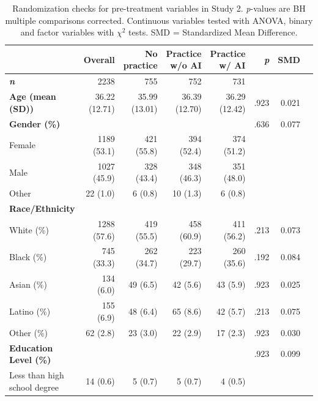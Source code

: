 \documentclass[11pt]{report}
\begin{document}
\begin{append}
\begin{table}[ht]
    \centering
        \caption{Randomization checks for pre-treatment variables in Study 2. \textit{p}-values are BH multiple comparisons corrected. Continuous variables tested with ANOVA, binary and factor variables with $\chi^2$ tests. SMD = Standardized Mean Difference.}
    \label{tab:s2randomization}
\begin{tabular}{lrrrrrrr}
\toprule
\multicolumn{1}{l}{} & Overall & No practice & Practice w/o AI & Practice w/ AI & \textit{p} &  SMD \\ 
\midrule\addlinespace[2.5pt]
\textit{\textbf{n}} & 2238 &  755 &  752 &  731 &  &   \\ 
\textbf{Age (mean (SD))} & 36.22 (12.71) & 35.99 (13.01) & 36.39 (12.70) & 36.29 (12.42) & .923  &  0.021 \\ 
\textbf{Gender (\%)} &  &   &   &   & .636 &   0.077 \\ 
\hspace{1em}   Female & 1189 (53.1)  &  421 (55.8)  &  394 (52.4)  &  374 (51.2)  &  &  \\ 
   \hspace{1em}Male & 1027 (45.9)  &  328 (43.4)  &  348 (46.3)  &  351 (48.0)  &  &    \\ 
   \hspace{1em}Other &   22 (1.0)  &    6 (0.8)  &   10 (1.3)  &    6 (0.8)    &  &  \\ 
   \textbf{Race/Ethnicity} &  &   &   &   &  &  \\
\hspace{1em}White (\%) & 1288 (57.6)  &  419 (55.5)  &  458 (60.9)  &  411 (56.2)  & .213 &  0.073 \\ 
\hspace{1em}Black (\%) &  745 (33.3)  &  262 (34.7)  &  223 (29.7)  &  260 (35.6)  & .192 &  0.084 \\ 
\hspace{1em}Asian (\%) &  134 (6.0)  &   49 (6.5)  &   42 (5.6)  &   43 (5.9)  & .923   &  0.025 \\ 
\hspace{1em}Latino (\%) &  155 (6.9)  &   48 (6.4)  &   65 (8.6)  &   42 (5.7)  & .213   &  0.075 \\
\hspace{1em}Other (\%) &   62 (2.8)  &   23 (3.0)  &   22 (2.9)  &   17 (2.3)  & .923 &   0.030 \\ 
\textbf{Education Level (\%)} &  &   &   &   & .923 &    0.099 \\ 
   \hspace{1em}Less than high school degree &   14 (0.6)  &    5 (0.7)  &    5 (0.7)  &    4 (0.5)  &    &  \\ 

\end{tabular}
\end{table}
\end{append}
\end{document}
